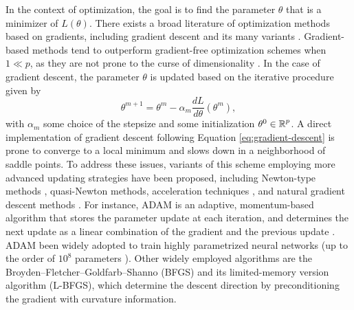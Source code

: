 In the context of optimization, the goal is to find the parameter $\theta$ that is a minimizer of $L(\theta)$. 
There exists a broad literature of optimization methods based on gradients, including gradient descent and its many variants \cite{ruder2016overview-gradient-descent}.
Gradient-based methods tend to outperform gradient-free optimization schemes when $1 \ll p$, as they are not prone to the curse of dimensionality \cite{Schartau2017}. 
In the case of gradient descent, the parameter $\theta$ is updated based on the iterative procedure given by
\begin{equation}\label{eq:gradient-descent}
    \theta^{m+1} 
    = 
    \theta^m 
    - 
    \alpha_m 
    \frac{dL}{d\theta}(\theta^m),
\end{equation}
with $\alpha_m$ some choice of the stepsize and some initialization $\theta^0 \in \operatorname{\mathbb{R}}^p$. 
A direct implementation of gradient descent following Equation \eqref{eq:gradient-descent} is prone to converge to a local minimum and slows down in a neighborhood of saddle points. 
To address these issues, variants of this scheme employing more advanced updating strategies have been proposed, including Newton-type methods \cite{second-order-optimization}, quasi-Newton methods, acceleration techniques \cite{JMLR:v22:20-207}, and natural gradient descent methods \cite{doi:10.1137/22M1477805}. 
For instance, ADAM is an adaptive, momentum-based algorithm  that stores the parameter update at each iteration, and determines the next update as a linear combination of the gradient and the previous update \cite{Kingma2014}.
ADAM been widely adopted to train highly parametrized neural networks (up to the order of $10^8$ parameters \cite{NIPS2017_3f5ee243}).
Other widely employed algorithms are the Broyden–Fletcher–Goldfarb–Shanno (BFGS) and its limited-memory version algorithm (L-BFGS), which determine the descent direction by preconditioning the gradient with curvature information. 

